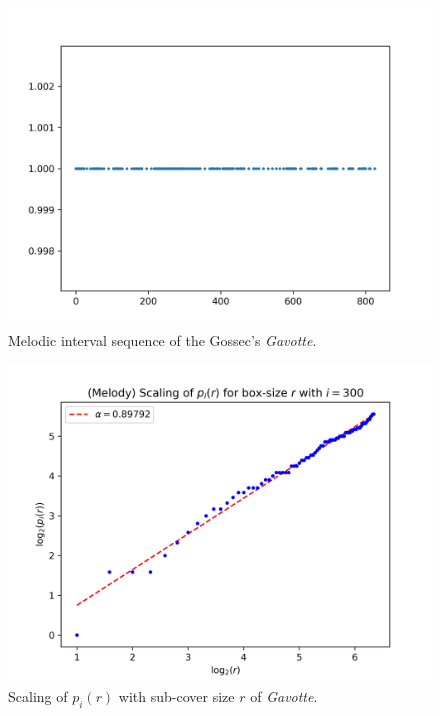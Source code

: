 \documentclass{article}
\begin{document}
\begin{figure}[ht!]
    \centering
    \includegraphics[width=\linewidth]{figures/results01.png}
    \caption{%
        Melodic interval sequence of the Gossec's \emph{Gavotte}.
    }\label{fig:results_1}
\end{figure}
\begin{figure}[ht!]
    \centering
    \includegraphics[width=\linewidth]{figures/results02.png}
    \caption{%
        Scaling of $p_i(r)$ with sub-cover size $r$ of \emph{Gavotte}.
    }\label{fig:results_2}
\end{figure}
\end{document}
